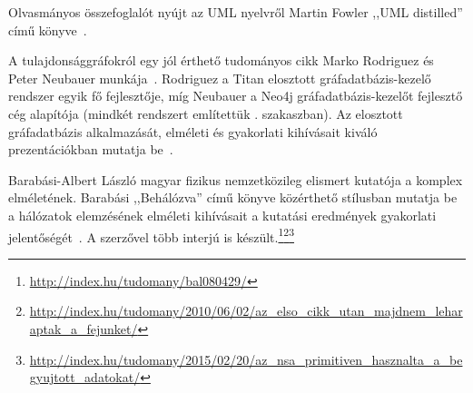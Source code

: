 Olvasmányos összefoglalót nyújt az UML nyelvről Martin Fowler ,,UML distilled'' című könyve~\cite{fowler1997uml}.

A tulajdonsággráfokról egy jól érthető tudományos cikk Marko Rodriguez és Peter Neubauer munkája~\cite{Rodriguez2010}. Rodriguez a Titan elosztott gráfadatbázis-kezelő rendszer egyik fő fejlesztője, míg Neubauer a Neo4j gráfadatbázis-kezelőt fejlesztő cég alapítója (mindkét rendszert említettük . szakaszban). Az elosztott gráfadatbázis alkalmazását, elméleti és gyakorlati kihívásait kiváló prezentációkban mutatja be~\cite{RodriguezSlides2012,RodriguezSlides2013}.

Barabási-Albert László magyar fizikus nemzetközileg elismert kutatója a komplex  elméletének. Barabási ,,Behálózva'' című könyve közérthető stílusban mutatja be a hálózatok elemzésének elméleti kihívásait a kutatási eredmények gyakorlati jelentőségét~\cite{behalozva}. A szerzővel több interjú is készült.\footnote{\url{http://index.hu/tudomany/bal080429/}}\footnote{\url{http://index.hu/tudomany/2010/06/02/az_elso_cikk_utan_majdnem_leharaptak_a_fejunket/}}\footnote{\url{http://index.hu/tudomany/2015/02/20/az_nsa_primitiven_hasznalta_a_begyujtott_adatokat/}}


